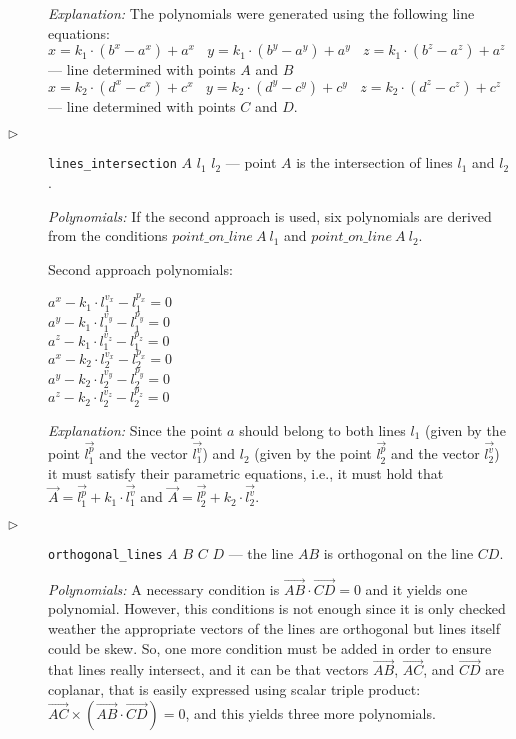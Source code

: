 \documentclass{article}
\begin{document}
\begin{description}
{\em Explanation:} The polynomials were generated using the following
line equations: \\ $x = k_1\cdot (b^x - a^x) + a^x \ \ \ \ y =
k_1\cdot (b^y - a^y) + a^y \ \ \ \ z = k_1\cdot (b^z - a^z) + a^z$ ---
line determined with points $A$ and $B$ \\ $x = k_2\cdot (d^x - c^x) +
c^x \ \ \ \ y = k_2\cdot (d^y - c^y) + c^y \ \ \ \ z = k_2\cdot (d^z -
c^z) + c^z$ --- line determined with points $C$ and $D$.

\item[$\triangleright$] {\tt lines\_intersection} $A$ $l_1$ $l_2$
  --- point $A$ is the intersection of lines $l_1$ and $l_2$.

  {\em Polynomials:} If the second approach is used, six polynomials
  are derived from the conditions $point\_on\_line\ A\ l_1$ and
  $point\_on\_line\ A\ l_2$.
  
  Second approach polynomials:
  \begin{tabbing}
    $a^x - k_1\cdot l_1^{v_x} - l_1^{p_x} = 0$ \\
    $a^y - k_1\cdot l_1^{v_y} - l_1^{p_y} = 0$ \\
    $a^z - k_1\cdot l_1^{v_z} - l_1^{p_z} = 0$ \\
    $a^x - k_2\cdot l_2^{v_x} - l_2^{p_x} = 0$ \\
    $a^y - k_2\cdot l_2^{v_y} - l_2^{p_y} = 0$ \\
    $a^z - k_2\cdot l_2^{v_z} - l_2^{p_z} = 0$
  \end{tabbing}

  {\em Explanation:} 
  Since the point $a$ should belong to both lines $l_1$ (given by the
  point $\overrightarrow{l_1^p}$ and the vector
  $\overrightarrow{l_1^v}$) and $l_2$ (given by the point
  $\overrightarrow{l_2^p}$ and the vector $\overrightarrow{l_2^v}$) it
  must satisfy their parametric equations, i.e., it must hold that
  $\overrightarrow{A} = \overrightarrow{l_1^p} + k_1 \cdot
  \overrightarrow{l_1^v}$
  and
  $\overrightarrow{A} = \overrightarrow{l_2^p} + k_2 \cdot
  \overrightarrow{l_2^v}$.


\item[$\triangleright$] {\tt orthogonal\_lines} $A$ $B$ $C$ $D$ ---
  the line $AB$ is orthogonal on the line $CD$.

  {\em Polynomials:} A necessary condition is
  $\overrightarrow{AB} \cdot \overrightarrow{CD} = 0$ and it yields
  one polynomial. However, this conditions is not enough since it is
  only checked weather the appropriate vectors of the lines are
  orthogonal but lines itself could be skew. So, one more condition
  must be added in order to ensure that lines really intersect, and it
  can be that vectors $\overrightarrow{AB}$, $\overrightarrow{AC}$,
  and $\overrightarrow{CD}$ are coplanar, that is easily expressed
  using scalar triple product:
  $\overrightarrow{AC} \times (\overrightarrow{AB} \cdot
  \overrightarrow{CD}) = 0$, and this yields three more polynomials.


\end{description}
\end{document}
